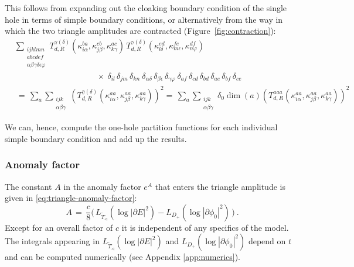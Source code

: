 \documentclass[11pt,a4paper]{article}
\numberwithin{equation}{section}
\begin{document}
This follows from expanding out the cloaking boundary condition of the single hole in terms of simple boundary conditions, or alternatively from the way in which the two triangle amplitudes are contracted (Figure~\ref{fig:contraction}): 
%
\begin{align}
    &\sum_{\begin{smallmatrix}ijklmn\\abcdef\\\alpha\beta\gamma\delta\epsilon\varphi\end{smallmatrix}} 
    T_{d,R}^{\gamma(\delta)}(\kappa_{i\alpha}^{ba},\kappa_{j\beta}^{cb},\kappa_{k\gamma}^{ac}) \,
    T_{d,R}^{\gamma(\delta)}(\kappa_{l\delta}^{ed},\kappa_{m\epsilon}^{fe},\kappa_{n\varphi}^{df})
    \nonumber\\[-2em]
    & \hspace{10em} \times ~
    \delta_{il} \, \delta_{jm} \, \delta_{kn}~
    \delta_{\alpha\delta} \, \delta_{\beta\epsilon} \, \delta_{\gamma\varphi}
    ~
    \delta_{af} \, \delta_{cd} \, \delta_{bd} \,  \delta_{ae} \, \delta_{bf} \, \delta_{ce} \nonumber\\[1em]
    &~=\, \sum_a\sum_{\begin{smallmatrix}ijk\\\alpha\beta\gamma\end{smallmatrix}} \left(T_{d,R}^{\gamma(\delta)}(\kappa_{i\alpha}^{aa},\kappa_{j\beta}^{aa},\kappa_{k\gamma}^{aa})\right)^2
    =\,
    \sum_a\sum_{\begin{smallmatrix}ijk\\\alpha\beta\gamma\end{smallmatrix}} \delta_0 \dim(a)\left(T_{d,R}^{aaa}(\kappa_{i\alpha}^{aa},\kappa_{j\beta}^{aa},\kappa_{k\gamma}^{aa})\right)^2
\end{align}



\noindent 
We can, hence, compute the one-hole partition functions for each individual simple boundary condition and add up the results. 
%
\subsubsection*{Anomaly factor}

The constant $A$ in the anomaly factor $e^A$ that enters the triangle amplitude is given in \eqref{eq:triangle-anomaly-factor}: 
%
\begin{equation}
    A \,=\, 
    \frac{c}{8}\Big(
    \, L_{\widetilde T_\triangleleft}(\log |\partial E|^2) - L_{D_+}(\log |\partial \phi_0|^2) \, \Big) \ .
\end{equation}
%
Except for an overall factor of $c$ it is independent of any specifics of the model. The integrals appearing in $L_{\widetilde T_\triangleleft}(\log |\partial E|^2)$ and $L_{D_+}(\log |\partial \phi_0|^2)$ depend on $t$ and can be computed numerically (see Appendix \ref{app:numerics}).
\end{document}
